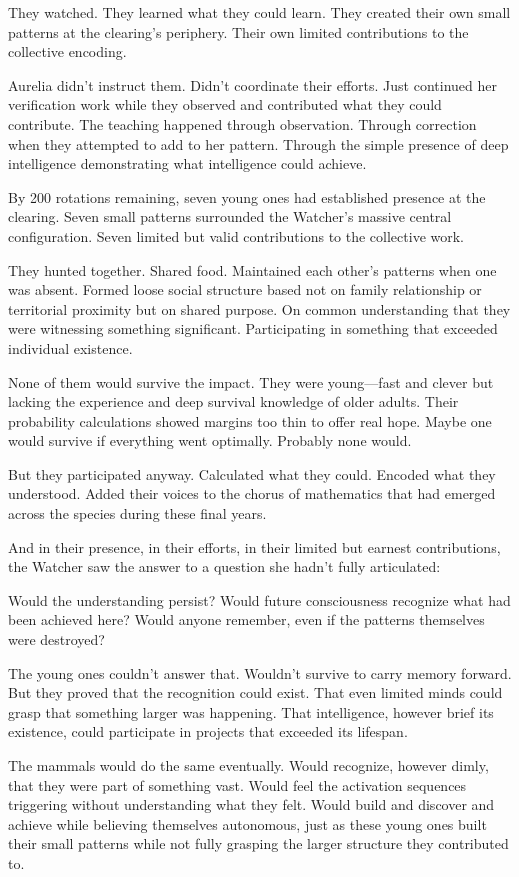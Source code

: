 They watched. They learned what they could learn. They created their own small patterns at the clearing's periphery. Their own limited contributions to the collective encoding.

Aurelia didn't instruct them. Didn't coordinate their efforts. Just continued her verification work while they observed and contributed what they could contribute. The teaching happened through observation. Through correction when they attempted to add to her pattern. Through the simple presence of deep intelligence demonstrating what intelligence could achieve.

By 200 rotations remaining, seven young ones had established presence at the clearing. Seven small patterns surrounded the Watcher's massive central configuration. Seven limited but valid contributions to the collective work.

They hunted together. Shared food. Maintained each other's patterns when one was absent. Formed loose social structure based not on family relationship or territorial proximity but on shared purpose. On common understanding that they were witnessing something significant. Participating in something that exceeded individual existence.

None of them would survive the impact. They were young—fast and clever but lacking the experience and deep survival knowledge of older adults. Their probability calculations showed margins too thin to offer real hope. Maybe one would survive if everything went optimally. Probably none would.

But they participated anyway. Calculated what they could. Encoded what they understood. Added their voices to the chorus of mathematics that had emerged across the species during these final years.

And in their presence, in their efforts, in their limited but earnest contributions, the Watcher saw the answer to a question she hadn't fully articulated:

Would the understanding persist? Would future consciousness recognize what had been achieved here? Would anyone remember, even if the patterns themselves were destroyed?

The young ones couldn't answer that. Wouldn't survive to carry memory forward. But they proved that the recognition could exist. That even limited minds could grasp that something larger was happening. That intelligence, however brief its existence, could participate in projects that exceeded its lifespan.

The mammals would do the same eventually. Would recognize, however dimly, that they were part of something vast. Would feel the activation sequences triggering without understanding what they felt. Would build and discover and achieve while believing themselves autonomous, just as these young ones built their small patterns while not fully grasping the larger structure they contributed to.

